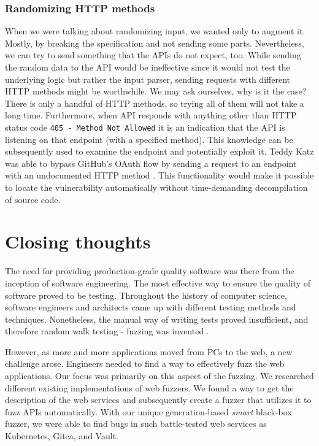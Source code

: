 \subsubsection{Randomizing HTTP methods}
When we were talking about randomizing input, we wanted only to augment it. Mostly, by breaking the specification and not sending some parts. Nevertheless, we can try to send something that the APIs do not expect, too. While sending the random data to the API would be ineffective since it would not test the underlying logic but rather the input parser, sending requests with different HTTP methods might be worthwhile. We may ask ourselves, why is it the case? There is only a handful of HTTP methods, so trying all of them will not take a long time. Furthermore, when API responds with anything other than HTTP status code \texttt{405 - Method Not Allowed} it is an indication that the API is listening on that endpoint (with a specified method). This knowledge can be subsequently used to examine the endpoint and potentially exploit it. Teddy Katz was able to bypass GitHub's OAuth flow by sending a request to an endpoint with an undocumented HTTP method \cite{kartz2019bypass}. This functionality would make it possible to locate the vulnerability automatically without time-demanding decompilation of source code.


\section{Closing thoughts}
The need for providing production-grade quality software was there from the inception of software engineering. The most effective way to ensure the quality of software proved to be testing. Throughout the history of computer science, software engineers and architects came up with different testing methods and techniques. Nonetheless, the manual way of writing tests proved insufficient, and therefore random walk testing - fuzzing was invented \cite{miller1990empirical}.

However, as more and more applications moved from PCs to the web, a new challenge arose. Engineers needed to find a way to effectively fuzz the web applications. Our focus was primarily on this aspect of the fuzzing. We researched different existing implementations of web fuzzers. We found a way to get the description of the web services and subsequently create a fuzzer that utilizes it to fuzz APIs automatically. With our unique generation-based \textit{smart} black-box fuzzer, we were able to find bugs in such battle-tested web services as Kubernetes, Gitea, and Vault.

